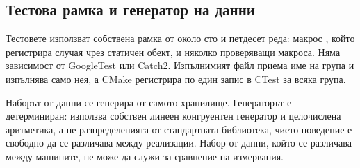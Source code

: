 \subsection{Тестова рамка и генератор на данни}

Тестовете използват собствена рамка от около сто и петдесет реда: макрос ,
който регистрира случая чрез статичен обект, и няколко проверяващи макроса. Няма
зависимост от GoogleTest или Catch2. Изпълнимият файл приема име на група и изпълнява
само нея, а CMake регистрира по един запис в CTest за всяка група.

Наборът от данни се генерира от самото хранилище. Генераторът е детерминиран: използва
собствен линеен конгруентен генератор и целочислена аритметика, а не разпределенията от
стандартната библиотека, чието поведение е свободно да се различава между реализации.
Набор от данни, който се различава между машините, не може да служи за сравнение на
измервания.
